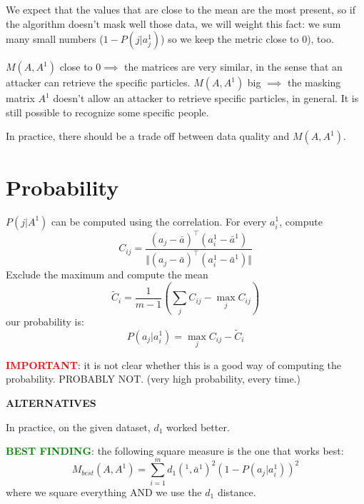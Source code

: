 \documentclass{article}
\renewcommand{\P}{P}
\begin{document}
We expect that the values that are close to the mean are the most present, so if the algorithm doesn't mask well those data, we will weight this fact: we sum many small numbers ($1-P(j| a_j^1)$) so we keep the metric close to $0$), too.

$M(A,A^1)$ close to $0 \implies $ the matrices are very similar, in the sense that an attacker can retrieve the specific particles. $M(A,A^1)$ big $\implies$ the masking matrix $A^1$ doesn't allow an attacker to retrieve specific particles, in general. It is still possible to recognize some specific people.

In practice, there should be a trade off between data quality and $M(A,A^1)$.

\section{Probability}

$P(j | A^1)$ can be computed using the correlation.
For every $a^1_i$, compute
\begin{equation}
	C_{ij} = \frac{(a_j - \bar{a})^\top (a^1_i - \bar{a}^1)}{\Vert (a_j - \bar{a})^\top (a^1_i - \bar{a}^1) \Vert}
\end{equation}
Exclude the maximum and compute the mean
\begin{equation}
	\tilde{C}_i = \frac{1}{m-1} \left(\sum_{j} C_{ij} - \max_j C_{ij}\right)
\end{equation}
our probability is:
\begin{equation}
	P(a_j | a_i^1) = \max_j C_{ij} - \tilde{C}_i
\end{equation}

\noindent\textcolor{red}{\textbf{IMPORTANT}}: it is not clear whether this is a good way of computing the probability. PROBABLY NOT. (very high probability, every time.)

\textbf{ALTERNATIVES}

In practice, on the given dataset, $d_1$ worked better.

\noindent\textcolor{green}{\textbf{BEST FINDING}}: the following square measure is the one that works best:
\begin{equation}
	M_{best}(A, A^1) = \sum_{i=1}^{m} d_1(^1, \bar{a}^1)^2 (1 - \P(a_j | a_i^1) )^2
\end{equation}
where we square everything AND we use the $d_1$ distance.
\end{document}
